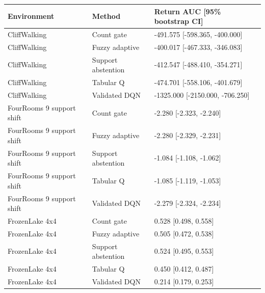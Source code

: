 \begin{tabular}{lll}
\toprule
Environment & Method & Return AUC [95\% bootstrap CI] \\
\midrule
CliffWalking & Count gate & -491.575 [-598.365, -400.000] \\
CliffWalking & Fuzzy adaptive & -400.017 [-467.333, -346.083] \\
CliffWalking & Support abstention & -412.547 [-488.410, -354.271] \\
CliffWalking & Tabular Q & -474.701 [-558.106, -401.679] \\
CliffWalking & Validated DQN & -1325.000 [-2150.000, -706.250] \\
FourRooms 9 support shift & Count gate & -2.280 [-2.323, -2.240] \\
FourRooms 9 support shift & Fuzzy adaptive & -2.280 [-2.329, -2.231] \\
FourRooms 9 support shift & Support abstention & -1.084 [-1.108, -1.062] \\
FourRooms 9 support shift & Tabular Q & -1.085 [-1.119, -1.053] \\
FourRooms 9 support shift & Validated DQN & -2.279 [-2.324, -2.234] \\
FrozenLake 4x4 & Count gate & 0.528 [0.498, 0.558] \\
FrozenLake 4x4 & Fuzzy adaptive & 0.505 [0.472, 0.538] \\
FrozenLake 4x4 & Support abstention & 0.524 [0.495, 0.553] \\
FrozenLake 4x4 & Tabular Q & 0.450 [0.412, 0.487] \\
FrozenLake 4x4 & Validated DQN & 0.214 [0.179, 0.253] \\
\bottomrule
\end{tabular}

